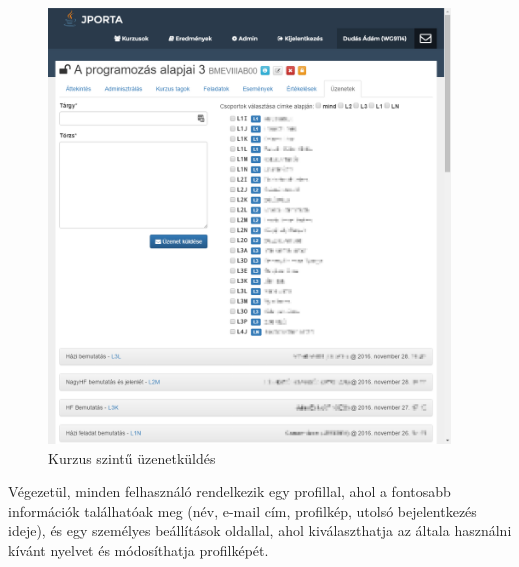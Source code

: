 \begin{figure}[h]
    \centering
    \includegraphics[width=0.95\textwidth]{figures/Jporta-course-messages}
    \caption{Kurzus szintű üzenetküldés}
    \label{figure:jporta-course-messages}
\end{figure}

Végezetül, minden felhasználó rendelkezik egy profillal, ahol a fontosabb információk találhatóak meg (név, e-mail cím, profilkép, utolsó bejelentkezés ideje), és egy személyes beállítások oldallal, ahol kiválaszthatja az általa használni kívánt nyelvet és módosíthatja profilképét.